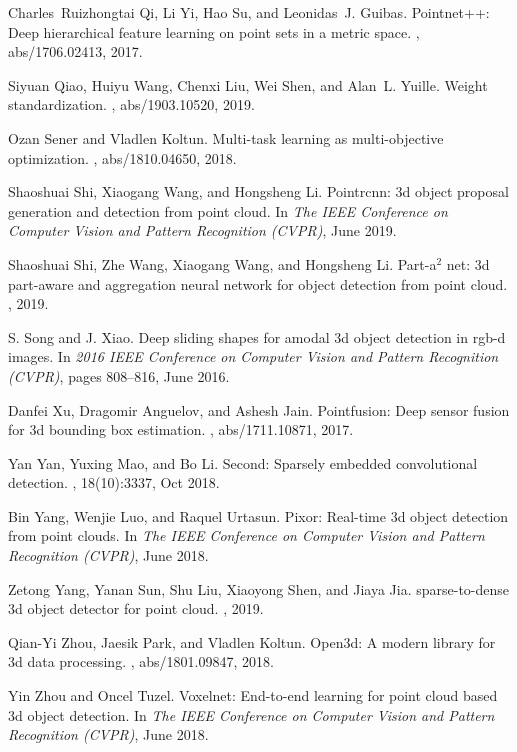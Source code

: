 \documentclass[10pt,twocolumn,letterpaper]{article}
\begin{document}
{\begin{thebibliography}{10}
Charles~Ruizhongtai Qi, Li Yi, Hao Su, and Leonidas~J. Guibas.
\newblock Pointnet++: Deep hierarchical feature learning on point sets in a
  metric space.
, abs/1706.02413, 2017.

Siyuan Qiao, Huiyu Wang, Chenxi Liu, Wei Shen, and Alan~L. Yuille.
\newblock Weight standardization.
, abs/1903.10520, 2019.

Ozan Sener and Vladlen Koltun.
\newblock Multi-task learning as multi-objective optimization.
, abs/1810.04650, 2018.

Shaoshuai Shi, Xiaogang Wang, and Hongsheng Li.
\newblock Pointrcnn: 3d object proposal generation and detection from point
  cloud.
\newblock In {\em The IEEE Conference on Computer Vision and Pattern
  Recognition (CVPR)}, June 2019.

Shaoshuai Shi, Zhe Wang, Xiaogang Wang, and Hongsheng Li.
\newblock Part-a$^2$ net: 3d part-aware and aggregation neural network for
  object detection from point cloud.
, 2019.

S. {Song} and J. {Xiao}.
\newblock Deep sliding shapes for amodal 3d object detection in rgb-d images.
\newblock In {\em 2016 IEEE Conference on Computer Vision and Pattern
  Recognition (CVPR)}, pages 808--816, June 2016.

Danfei Xu, Dragomir Anguelov, and Ashesh Jain.
\newblock Pointfusion: Deep sensor fusion for 3d bounding box estimation.
, abs/1711.10871, 2017.

Yan Yan, Yuxing Mao, and Bo Li.
\newblock Second: Sparsely embedded convolutional detection.
, 18(10):3337, Oct 2018.

Bin Yang, Wenjie Luo, and Raquel Urtasun.
\newblock Pixor: Real-time 3d object detection from point clouds.
\newblock In {\em The IEEE Conference on Computer Vision and Pattern
  Recognition (CVPR)}, June 2018.

Zetong Yang, Yanan Sun, Shu Liu, Xiaoyong Shen, and Jiaya Jia.
 sparse-to-dense 3d object detector for point cloud.
, 2019.

Qian{-}Yi Zhou, Jaesik Park, and Vladlen Koltun.
\newblock Open3d: {A} modern library for 3d data processing.
, abs/1801.09847, 2018.

Yin Zhou and Oncel Tuzel.
\newblock Voxelnet: End-to-end learning for point cloud based 3d object
  detection.
\newblock In {\em The IEEE Conference on Computer Vision and Pattern
  Recognition (CVPR)}, June 2018.

\end{thebibliography}
 }
\end{document}
